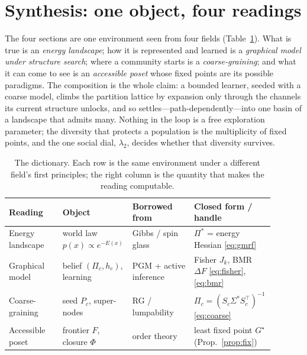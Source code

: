 \documentclass[11pt]{article}
\theoremstyle{definition}
\theoremstyle{plain}
\begin{document}
\section{Synthesis: one object, four readings}
\label{sec:synthesis}

The four sections are one environment seen from four fields (Table~\ref{tab:dict}). What is true is
an \emph{energy landscape}; how it is represented and learned is a \emph{graphical model under
structure search}; where a community starts is a \emph{coarse-graining}; and what it can come to see
is an \emph{accessible poset} whose fixed points are its possible paradigms. The composition is the
whole claim: a bounded learner, seeded with a coarse model, climbs the partition lattice by expansion
only through the channels its current structure unlocks, and so settles---path-dependently---into one
basin of a landscape that admits many. Nothing in the loop is a free exploration parameter; the
diversity that protects a population is the multiplicity of fixed points, and the one social dial,
$\lambda_2$, decides whether that diversity survives.

\begin{table}[h]
\centering\footnotesize
\renewcommand{\arraystretch}{1.12}
\begin{tabular}{@{}p{0.205\linewidth}p{0.215\linewidth}p{0.235\linewidth}p{0.235\linewidth}@{}}
\hline
\textbf{Reading} & \textbf{Object} & \textbf{Borrowed from} & \textbf{Closed form / handle}\\
\hline
Energy landscape & world law $p(x)\propto e^{-E(x)}$ & Gibbs / spin glass \citep{hopfield1982,mpv1987} & $\Pi^\ast$ = energy Hessian \eqref{eq:gmrf}\\
Graphical model & belief $(\Pi_c,h_c)$, learning & PGM + active inference \citep{pearl2009,friston2018bmr} & Fisher $J_k$, BMR $\Delta F$ \eqref{eq:fisher},\eqref{eq:bmr}\\
Coarse-graining & seed $P_c$, super-nodes & RG / lumpability \citep{wilson1975,kemenysnell1976} & $\Pi_c=(S_c\Sigma^\ast S_c^\top)^{-1}$ \eqref{eq:coarse}\\
Accessible poset & frontier $F$, closure $\Phi$ & order theory \citep{kls1991,tarski1955} & least fixed point $G^\star$ (Prop.~\ref{prop:fix})\\
\hline
\end{tabular}
\caption{The dictionary. Each row is the same environment under a different field's first principles;
the right column is the quantity that makes the reading computable.}
\label{tab:dict}
\end{table}
\end{document}
